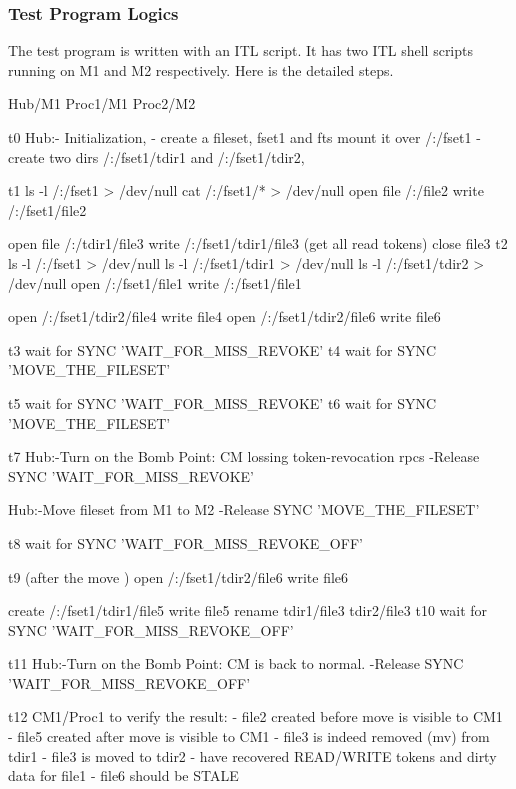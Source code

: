 \subsubsection {Test Program Logics}

The test program is written with an ITL script. It has two ITL shell scripts
running on M1 and M2 respectively. Here is the detailed steps.

\begin{programexample}

    Hub/M1              Proc1/M1                        Proc2/M2

t0  Hub:- Initialization,
        - create a fileset, fset1 and fts mount it over /:/fset1
        - create two dirs /:/fset1/tdir1 and /:/fset1/tdir2,

t1							ls -l /:/fset1  > /dev/null
							cat /:/fset1/* > /dev/null
							open file /:/file2
							write /:/fset1/file2

							open file /:/tdir1/file3
							write /:/fset1/tdir1/file3
							(get all read tokens)
							close file3
t2		ls -l /:/fset1 > /dev/null 				
		ls -l /:/fset1/tdir1 > /dev/null
		ls -l /:/fset1/tdir2 > /dev/null
		open /:/fset1/file1
		write /:/fset1/file1

		open /:/fset1/tdir2/file4
		write file4
		open /:/fset1/tdir2/file6
		write file6

t3		wait for SYNC 'WAIT_FOR_MISS_REVOKE'
t4		wait for SYNC 'MOVE_THE_FILESET'

t5							wait for SYNC 'WAIT_FOR_MISS_REVOKE'
t6							wait for SYNC 'MOVE_THE_FILESET'

t7  Hub:-Turn on the Bomb Point:
	 CM lossing token-revocation rpcs
	-Release SYNC 'WAIT_FOR_MISS_REVOKE'

    Hub:-Move fileset from M1 to M2
	-Release SYNC 'MOVE_THE_FILESET'

t8		wait for SYNC 'WAIT_FOR_MISS_REVOKE_OFF'

t9							(after the move )
					                open /:/fset1/tdir2/file6
					                write file6

							create /:/fset1/tdir1/file5
							write file5	
							rename tdir1/file3 tdir2/file3
t10							wait for SYNC 'WAIT_FOR_MISS_REVOKE_OFF'

t11 Hub:-Turn on the Bomb Point:
	 CM is back to normal.
	-Release SYNC 'WAIT_FOR_MISS_REVOKE_OFF'
	

t12		CM1/Proc1 to verify the result:
		- file2 created before move is visible to CM1
		- file5 created after move is visible to CM1
		- file3 is indeed removed (mv) from tdir1
		- file3 is moved to tdir2
		- have recovered READ/WRITE tokens and dirty data for file1
		- file6 should be STALE
\end{programexample}

